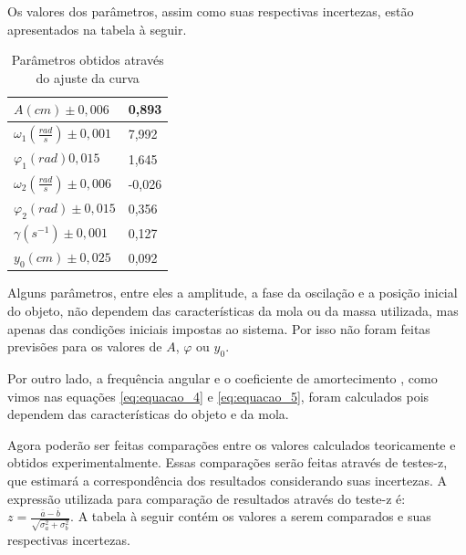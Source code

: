 \documentclass[12pt]{article}
\begin{document}
		Os valores dos parâmetros, assim como suas respectivas incertezas, estão apresentados na tabela à seguir.
		
		\begin{table}[H]
			\centering
			\begin{tabular}{|l|l|}
				\hline
				$A (cm) \pm 0,006$ & 0,893   \\ \hline
				$\omega_1 (\frac{rad}{s}) \pm 0,001$ & 7,992 \\ \hline
				$\varphi_1 (rad) 0,015$ &  1,645\\ \hline
				$\omega_2 (\frac{rad}{s})\pm 0,006$ & -0,026 \\ \hline
				$\varphi_2 (rad)\pm 0,015$ & 0,356 \\ \hline
				$\gamma (s^{-1}) \pm 0,001$ & 0,127 \\ \hline
				$y_0 (cm) \pm 0,025$ & 0,092 \\ \hline
			\end{tabular}
			\caption{Parâmetros obtidos através do ajuste da curva}
			\label{tab:table2}
		\end{table}	
	
		Alguns parâmetros, entre eles a amplitude, a fase da oscilação e a posição inicial do objeto, não dependem das características da mola ou da massa utilizada, mas apenas das condições iniciais impostas ao sistema. Por isso não foram feitas previsões para os valores de $A$, $\varphi$ ou $y_0$.
		
		Por outro lado, a frequência angular  e o coeficiente de amortecimento , como vimos nas equações  \ref{eq:equacao_4} e \ref{eq:equacao_5}, foram calculados pois dependem das características do objeto e da mola.
		
		Agora poderão ser feitas comparações entre os valores calculados teoricamente e obtidos experimentalmente. Essas comparações serão feitas através de testes-z, que estimará a correspondência dos resultados considerando suas incertezas. A expressão utilizada para comparação de resultados  através do teste-z é: $z=\frac{\bar a - \bar b}{\sqrt{\sigma_a^2+\sigma_b^2}}$. A tabela à seguir contém os valores a serem comparados e suas respectivas incertezas.
\end{document}
